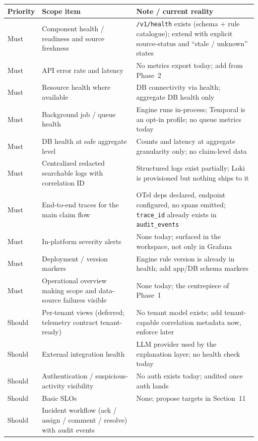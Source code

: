 \documentclass[11pt]{article}
\newcommand{\code}[1]{\texttt{#1}}
\begin{document}
\begin{table}[h]
\centering
\small
\begin{tabularx}{\textwidth}{@{} l L L @{}}
\toprule
\textbf{Priority} & \textbf{Scope item} & \textbf{Note / current reality} \\
\midrule
Must & Component health / readiness and source freshness &
\code{/v1/health} exists (schema + rule catalogue); extend with explicit
source-status and ``stale / unknown'' states \\
Must & API error rate and latency &
No metrics export today; add from Phase~2 \\
Must & Resource health where available &
DB connectivity via health; aggregate DB health only \\
Must & Background job / queue health &
Engine runs in-process; Temporal is an opt-in profile; no queue metrics today \\
Must & DB health at safe aggregate level &
Counts and latency at aggregate granularity only; no claim-level data \\
Must & Centralized redacted searchable logs with correlation ID &
Structured logs exist partially; Loki is provisioned but nothing ships to it \\
Must & End-to-end traces for the main claim flow &
OTel deps declared, endpoint configured, no spans emitted; \code{trace\_id}
already exists in \code{audit\_events} \\
Must & In-platform severity alerts &
None today; surfaced in the workspace, not only in Grafana \\
Must & Deployment / version markers &
Engine rule version is already in health; add app/DB schema markers \\
Must & Operational overview making scope and data-source failures visible &
None today; the centrepiece of Phase~1 \\
\midrule
Should & Per-tenant views (deferred; telemetry contract tenant-ready) &
No tenant model exists; add tenant-capable correlation metadata now, enforce
later \\
Should & External integration health &
LLM provider used by the explanation layer; no health check today \\
Should & Authentication / suspicious-activity visibility &
No auth exists today; audited once auth lands \\
Should & Basic SLOs &
None; propose targets in Section~11 \\
Should & Incident workflow (ack / assign / comment / resolve) with audit events &

\end{tabularx}
\end{table}
\end{document}
